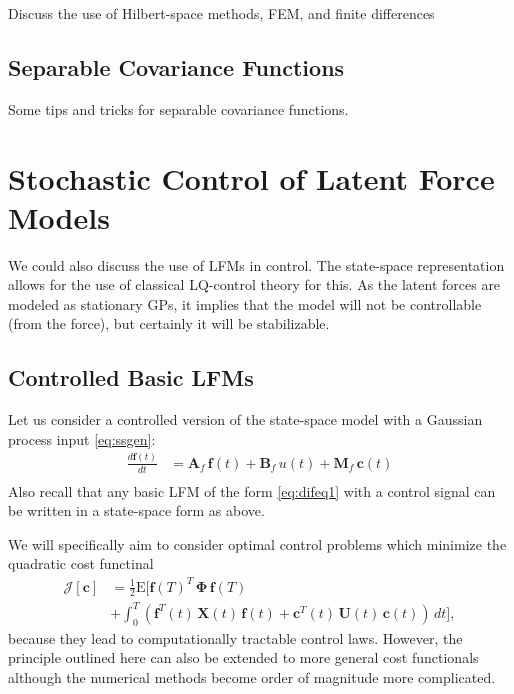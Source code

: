 \documentclass[journal]{IEEEtran}
\newcommand{\simo}[1]{{\color{red}#1}}
\begin{document}
\simo{Discuss the use of Hilbert-space methods, FEM, and finite differences}

\subsection{Separable Covariance Functions}
%
\simo{Some tips and tricks for separable covariance functions.}



\section{Stochastic Control of Latent Force Models}
%
\simo{We could also discuss the use of LFMs in control. The state-space representation allows for the use of classical LQ-control theory for this. As the latent forces are modeled as stationary GPs, it implies that the model will not be controllable (from the force), but certainly it will be stabilizable. }

\subsection{Controlled Basic LFMs}
%
Let us consider a controlled version of the state-space model with a Gaussian process input \eqref{eq:ssgen}:
\begin{equation}
\begin{split}
  \frac{d\mathbf{f}(t)}{dt}
  &= \mathbf{A}_f \, \mathbf{f}(t) + \mathbf{B}_f \, u(t) + \mathbf{M}_f \, \mathbf{c}(t) \\
\end{split}
\end{equation}
%
Also recall that any basic LFM of the form \eqref{eq:difeq1} with a control signal can be written in a state-space form as above.

We will specifically aim to consider optimal control problems which minimize the quadratic cost functinal
%
\begin{equation}
\begin{split}
  \mathcal{J}[\mathbf{c}] &= \frac{1}{2} \mathrm{E} \Big[
    \mathbf{f}(T)^T \, \boldsymbol{\Phi} \, \mathbf{f}(T) \\
   &+ \int_0^T
   (\mathbf{f}^T(t) \, \mathbf{X}(t) \, \mathbf{f}(t)
  + \mathbf{c}^T(t) \, \mathbf{U}(t) \, \mathbf{c}(t)) \, dt \Big],
\end{split}
\label{eq:quadcost1}
\end{equation}
%
because they lead to computationally tractable control laws. However, the principle outlined here can also be extended to more general cost functionals although the numerical methods become order of magnitude more complicated.
\end{document}
